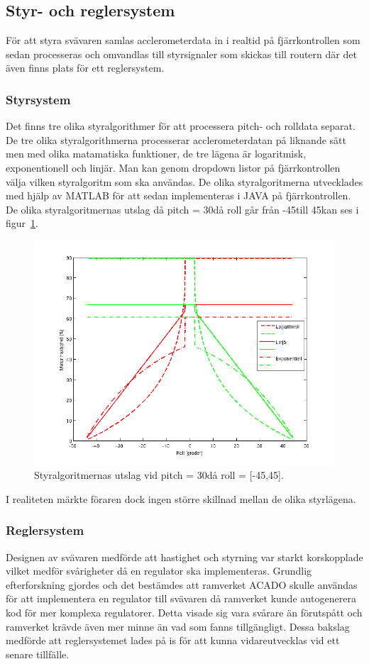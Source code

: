 \subsection{Styr- och reglersystem}
\label{subsec:styr och regler}
För att styra svävaren samlas acclerometerdata in i realtid på fjärrkontrollen som sedan processeras och omvandlas till styrsignaler som skickas till routern där det även finns plats för ett reglersystem.

\subsubsection{Styrsystem}
Det finns tre olika styralgorithmer för att processera pitch- och rolldata separat. De tre olika styralgorithmerna processerar acclerometerdatan på liknande sätt men med olika matamatiska funktioner, de tre lägena är logaritmisk, exponentionell och linjär. Man kan genom dropdown listor på fjärrkontrollen välja vilken styralgoritm som ska användas. De olika styralgoritmerna utvecklades med hjälp av MATLAB för att sedan implementeras i JAVA på fjärrkontrollen. De olika styralgoritmernas utslag då pitch = 30\degree  då roll går från -45\degree till 45\degree  kan ses i figur~\ref{fig:styralgoritmer}.

\begin{figure}[htbp!]
\centering
\includegraphics[width=12cm]{../../includes/figures/Styralgoritmer}
\caption{Styralgoritmernas utslag vid pitch = 30\degree då roll = [-45,45].}
\label{fig:styralgoritmer}
\end{figure}

I realiteten märkte föraren dock ingen större skillnad mellan de olika styrlägena. 

\subsubsection{Reglersystem}
Designen av svävaren medförde att hastighet och styrning var starkt korskopplade vilket medför svårigheter då en regulator ska implementeras. Grundlig efterforskning gjordes och det bestämdes att ramverket ACADO skulle användas för att implementera en regulator till svävaren då ramverket kunde autogenerera kod för mer komplexa regulatorer. Detta visade sig vara svårare än förutspått och ramverket krävde även mer minne än vad som fanns tillgängligt. Dessa bakslag medförde att reglersystemet lades på is för att kunna vidareutvecklas vid ett senare tillfälle.
